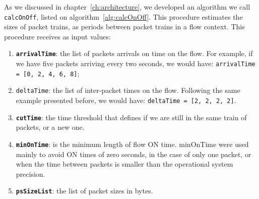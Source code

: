 As we discussed in chapter~\ref{ch:architecture},  we developed an algorithm we call \texttt{calcOnOff}, listed on algorithm~\ref{alg:calcOnOff}. This procedure estimates the sizes of packet trains, as periods between packet trains in a flow context. 
This procedure receives as input values:

\begin{enumerate}
\item  \textbf{\texttt{arrivalTime}}: the list of packets arrivals on time on the flow. For example, if we have five packets arriving every two seconds, we would have: \texttt{arrivalTime = [0, 2, 4,  6, 8]};
\item  \texttt{deltaTime}: the list of inter-packet times on the flow. Following the same example presented before, we would have: \texttt{deltaTime = [2, 2, 2, 2]}. 
\item  \textbf{\texttt{cutTime}}: the time threshold that defines if we are still in the same train of packets, or a new one. 
\item  \textbf{\texttt{minOnTime}}: is the minimum length of flow ON time. minOnTime were used mainly to avoid ON times of zero seconds, in the case of only one packet, or when the time between packets is smaller than the operational system precision. 
\item  \textbf{\texttt{psSizeList}}: the list of packet sizes in bytes. 
\end{enumerate}


